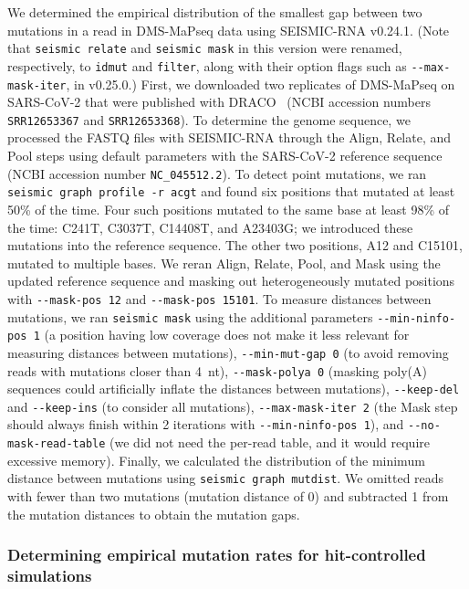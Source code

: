 \documentclass[unnumsec,webpdf,contemporary,large]{oup-authoring-template}%
\theoremstyle{thmstyleone}%
\theoremstyle{thmstyletwo}%
\theoremstyle{thmstylethree}%
\begin{document}
We determined the empirical distribution of the smallest gap between two mutations in a read in DMS-MaPseq data using SEISMIC-RNA v0.24.1.
(Note that \verb|seismic relate| and \verb|seismic mask| in this version were renamed, respectively, to \verb|idmut| and \verb|filter|, along with their option flags such as \verb|--max-mask-iter|, in v0.25.0.)
First, we downloaded two replicates of DMS-MaPseq on SARS-CoV-2 that were published with DRACO~\cite{Morandi2021} (NCBI accession numbers \verb|SRR12653367| and \verb|SRR12653368|).
To determine the genome sequence, we processed the FASTQ files with SEISMIC-RNA through the Align, Relate, and Pool steps using default parameters with the SARS-CoV-2 reference sequence (NCBI accession number \verb|NC_045512.2|).
To detect point mutations, we ran \verb|seismic graph profile -r acgt| and found six positions that mutated at least 50\% of the time.
Four such positions mutated to the same base at least 98\% of the time: C241T, C3037T, C14408T, and A23403G; we introduced these mutations into the reference sequence.
The other two positions, A12 and C15101, mutated to multiple bases.
We reran Align, Relate, Pool, and Mask using the updated reference sequence and masking out heterogeneously mutated positions with \verb|--mask-pos 12| and \verb|--mask-pos 15101|.
To measure distances between mutations, we ran \verb|seismic mask| using the additional parameters \verb|--min-ninfo-pos 1| (a position having low coverage does not make it less relevant for measuring distances between mutations), \verb|--min-mut-gap 0| (to avoid removing reads with mutations closer than 4~nt), \verb|--mask-polya 0| (masking poly(A) sequences could artificially inflate the distances between mutations), \verb|--keep-del| and \verb|--keep-ins| (to consider all mutations), \verb|--max-mask-iter 2| (the Mask step should always finish within 2 iterations with \verb|--min-ninfo-pos 1|), and \verb|--no-mask-read-table| (we did not need the per-read table, and it would require excessive memory).
Finally, we calculated the distribution of the minimum distance between mutations using \verb|seismic graph mutdist|.
We omitted reads with fewer than two mutations (mutation distance of 0) and subtracted 1 from the mutation distances to obtain the mutation gaps.

\subsubsection{Determining empirical mutation rates for hit-controlled simulations}
\label{empirical-mutation-rates}
\end{document}
